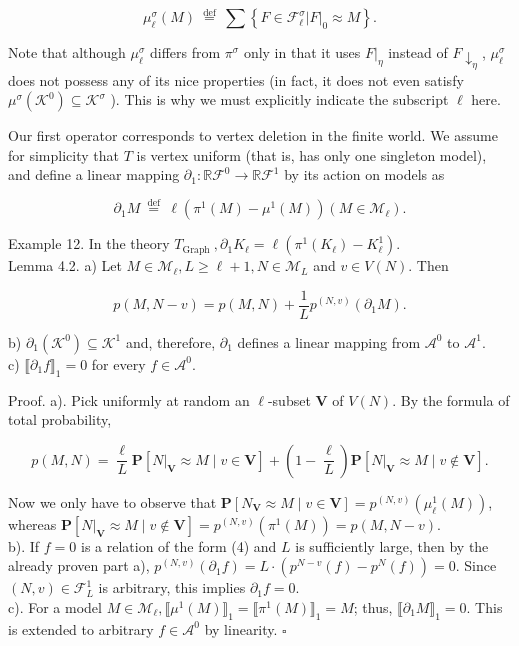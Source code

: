 \documentclass[10pt]{article}
\begin{document}
$$
\mu_{\ell}^{\sigma}(M) \stackrel{\text { def }}{=} \sum\left\{F \in \mathcal{F}_{\ell}^{\sigma}|F|_{0} \approx M\right\} .
$$

Note that although $\mu_{\ell}^{\sigma}$ differs from $\pi^{\sigma}$ only in that it uses $\left.F\right|_{\eta}$ instead of $F \downarrow_{\eta}$, $\mu_{\ell}^{\sigma}$ does not possess any of its nice properties (in fact, it does not even satisfy $\mu^{\sigma}\left(\mathcal{K}^{0}\right) \subseteq \mathcal{K}^{\sigma}$ ). This is why we must explicitly indicate the subscript $\ell$ here.

Our first operator corresponds to vertex deletion in the finite world. We assume for simplicity that $T$ is vertex uniform (that is, has only one singleton model), and define a linear mapping $\partial_{1}: \mathbb{R} \mathcal{F}^{0} \longrightarrow \mathbb{R} \mathcal{F}^{1}$ by its action on models as

$$
\partial_{1} M \stackrel{\text { def }}{=} \ell\left(\pi^{1}(M)-\mu^{1}(M)\right)\left(M \in \mathcal{M}_{\ell}\right) .
$$

Example 12. In the theory $T_{\text {Graph }}, \partial_{1} K_{\ell}=\ell\left(\pi^{1}\left(K_{\ell}\right)-K_{\ell}^{1}\right)$.\\
Lemma 4.2. a) Let $M \in \mathcal{M}_{\ell}, L \geq \ell+1, N \in \mathcal{M}_{L}$ and $v \in V(N)$. Then

$$
p(M, N-v)=p(M, N)+\frac{1}{L} p^{(N, v)}\left(\partial_{1} M\right) .
$$

b) $\partial_{1}\left(\mathcal{K}^{0}\right) \subseteq \mathcal{K}^{1}$ and, therefore, $\partial_{1}$ defines a linear mapping from $\mathcal{A}^{0}$ to $\mathcal{A}^{1}$.\\
c) $\llbracket \partial_{1} f \rrbracket_{1}=0$ for every $f \in \mathcal{A}^{0}$.

Proof. a). Pick uniformly at random an $\ell$-subset $\boldsymbol{V}$ of $V(N)$. By the formula of total probability,

$$
p(M, N)=\frac{\ell}{L} \mathbf{P}\left[\left.N\right|_{\boldsymbol{V}} \approx M \mid v \in \boldsymbol{V}\right]+\left(1-\frac{\ell}{L}\right) \mathbf{P}\left[\left.N\right|_{\boldsymbol{V}} \approx M \mid v \notin \boldsymbol{V}\right] .
$$

Now we only have to observe that $\mathbf{P}\left[N_{\boldsymbol{V}} \approx M \mid v \in \boldsymbol{V}\right]=p^{(N, v)}\left(\mu_{\ell}^{1}(M)\right)$, whereas $\mathbf{P}\left[\left.N\right|_{\boldsymbol{V}} \approx M \mid v \notin \boldsymbol{V}\right]=p^{(N, v)}\left(\pi^{1}(M)\right)=p(M, N-v)$.\\
b). If $f=0$ is a relation of the form (4) and $L$ is sufficiently large, then by the already proven part a), $p^{(N, v)}\left(\partial_{1} f\right)=L \cdot\left(p^{N-v}(f)-p^{N}(f)\right)=0$. Since $(N, v) \in \mathcal{F}_{L}^{1}$ is arbitrary, this implies $\partial_{1} f=0$.\\
c). For a model $M \in \mathcal{M}_{\ell}, \llbracket \mu^{1}(M) \rrbracket_{1}=\llbracket \pi^{1}(M) \rrbracket_{1}=M$; thus, $\llbracket \partial_{1} M \rrbracket_{1}=0$. This is extended to arbitrary $f \in \mathcal{A}^{0}$ by linearity. \(\square\)
\end{document}
